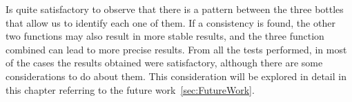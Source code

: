 Is quite satisfactory to observe that there is a pattern between the three bottles that allow us to identify each one of them. If a consistency is found, the other two functions may also result in more stable results, and the three function combined can lead to more precise results.
From all the tests performed, in most of the cases the results obtained were satisfactory, although there are some considerations to do about them. This consideration will be explored in detail in this chapter referring to the future work~\ref{sec:FutureWork}.


\clearpage

